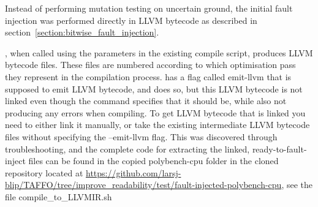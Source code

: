 Instead of performing mutation testing on uncertain ground, the initial fault injection was performed directly in LLVM bytecode as described in section~\ref{section:bitwise_fault_injection}.

\taffo{}, when called using the parameters in the existing compile script, produces LLVM bytecode files. These files are numbered according to which optimisation pass they represent in the \taffo{} compilation process. \taffo{} has a flag called emit-llvm that is supposed to emit LLVM bytecode, and does so, but this LLVM bytecode is not linked even though the \taffo{} command specifies that it should be, while also not producing any errors when compiling. To get LLVM bytecode that is linked you need to either link it manually, or take the existing intermediate LLVM bytecode files without specifying the --emit-llvm flag. This was discovered through troubleshooting, and the complete code for extracting the linked, ready-to-fault-inject files can be found in the copied polybench-cpu folder in the cloned \taffo{} repository located at \url{https://github.com/larsj-blip/TAFFO/tree/improve_readability/test/fault-injected-polybench-cpu}, see the file compile\_to\_LLVMIR.sh

